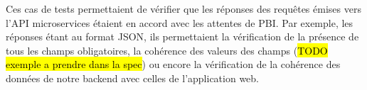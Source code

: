 	Ces cas de tests permettaient de vérifier que les réponses des requêtes émises vers l'API microservices étaient en accord avec les attentes de PBI. Par exemple, les réponses étant au format JSON, ils permettaient la vérification de la présence de tous les champs obligatoires, la cohérence des valeurs des champs (\hl{TODO exemple a prendre dans la spec}) ou encore la vérification de la cohérence des données de notre backend avec celles de l'application web.